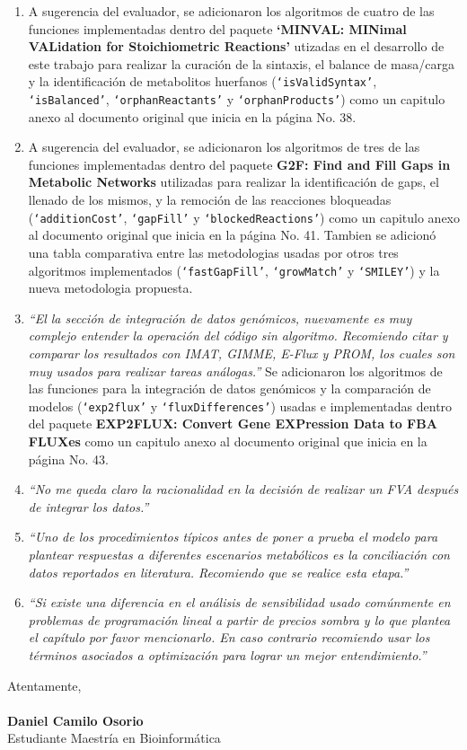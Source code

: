 \documentclass[11pt,a4paper]{article}
\begin{document}
\begin{enumerate}
\item A sugerencia del evaluador, se adicionaron los algoritmos de cuatro de las  funciones implementadas dentro del paquete \textbf{`MINVAL: MINimal VALidation for Stoichiometric Reactions'} utizadas en el desarrollo de este trabajo para realizar la curación de la sintaxis, el balance de masa/carga y  la identificación de metabolitos huerfanos (\texttt{`isValidSyntax'}, \texttt{`isBalanced'}, \texttt{`orphanReactants'} y \texttt{`orphanProducts'}) como un capitulo anexo al documento original que inicia en la página No. 38.

\item A sugerencia del evaluador, se adicionaron los algoritmos de tres de las funciones implementadas dentro del paquete \textbf{G2F: Find and Fill Gaps in Metabolic Networks} utilizadas para realizar la identificación de gaps, el llenado de los mismos, y la remoción de las reacciones bloqueadas (\texttt{`additionCost'}, \texttt{`gapFill'} y \texttt{`blockedReactions'}) como un capitulo anexo al documento original que inicia en la página No. 41. Tambien se adicionó una tabla comparativa entre las metodologias usadas por otros tres algoritmos implementados (\texttt{`fastGapFill'}, \texttt{`growMatch'} y \texttt{`SMILEY'}) y la nueva metodologia propuesta.
\item \emph{``El la sección de integración de datos genómicos, nuevamente es muy complejo entender la operación del código sin algoritmo. Recomiendo citar y comparar los resultados con IMAT, GIMME, E-Flux y PROM, los cuales son muy usados para realizar tareas análogas.''} Se adicionaron los algoritmos de las funciones para la integración de datos genómicos y la comparación de modelos  (\texttt{`exp2flux'} y \texttt{`fluxDifferences'}) usadas e implementadas dentro del paquete \textbf{EXP2FLUX: Convert Gene EXPression Data to FBA FLUXes} como un capitulo anexo al documento original que inicia en la página No. 43.

\item \emph{``No me queda claro la racionalidad en la decisión de realizar un FVA después de integrar los datos.''}

\item \emph{``Uno de los procedimientos típicos antes de poner a prueba el modelo para plantear respuestas a diferentes escenarios metabólicos es la conciliación con datos reportados en literatura. Recomiendo que se realice esta etapa.''}

\item \emph{``Si existe una diferencia en el análisis de sensibilidad usado comúnmente en problemas de programación lineal a partir de precios sombra y lo que plantea el capítulo por favor mencionarlo. En caso contrario recomiendo usar los términos asociados a optimización para lograr un mejor entendimiento.''}

\end{enumerate}
Atentamente,\\
\\
\textbf{Daniel Camilo Osorio}\\
Estudiante Maestría en Bioinformática
\end{document}

